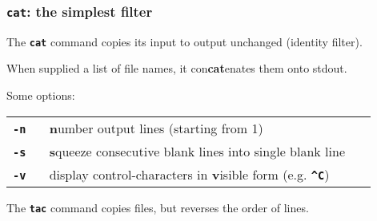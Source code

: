 \begin{frame}
\frametitle{\textbf{\tt{cat}}: the simplest filter}
The \textbf{\tt{cat}} command copies its input to output unchanged (identity filter).

When supplied a list of file names, it con{\bf{cat}}enates them onto stdout. 

Some options:


\begin{center}
\begin{tabular}{lll}

  \begin{minipage}{1cm}{\bf{\textbf{\tt{-n}}}} ~\end{minipage}
   & \begin{minipage}{18cm}{\bf{n}}umber output lines {\small (starting from 1)}~\end{minipage}
\\[1ex]

  \begin{minipage}{1cm}{\bf{\textbf{\tt{-s}}}} ~\end{minipage}
   & \begin{minipage}{18cm}{\bf{s}}queeze consecutive blank lines into single blank line~\end{minipage}
\\[1ex]

  \begin{minipage}{1cm}{\bf{\textbf{\tt{-v}}}} ~\end{minipage}
   & \begin{minipage}{18cm}display control-characters in {\bf{v}}isible form (e.g. \textbf{\tt{{\textasciicircum}C}})~\end{minipage}
\\[1ex]
\end{tabular}
\end{center}


The \textbf{\tt{tac}} command copies files, but reverses the order of lines.

\end{frame}

